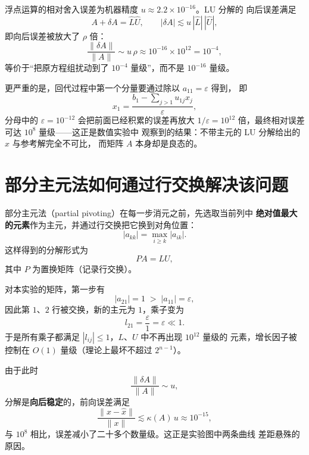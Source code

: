 \documentclass[12pt,a4paper]{ctexart}
\begin{document}
浮点运算的相对舍入误差为机器精度 $u \approx 2.2\times 10^{-16}$。LU 分解的
向后误差满足
\begin{equation}
  A + \delta A = \hat{L}\hat{U},
  \qquad
  |\delta A| \lesssim u\, |\hat{L}|\,|\hat{U}|,
\end{equation}
即向后误差被放大了 $\rho$ 倍：
\begin{equation}
  \frac{\|\delta A\|}{\|A\|} \sim u\,\rho \approx 10^{-16}\times 10^{12} = 10^{-4},
\end{equation}
等价于“把原方程组扰动到了 $10^{-4}$ 量级”，而不是 $10^{-16}$ 量级。

更严重的是，回代过程中第一个分量要通过除以 $a_{11}=\varepsilon$ 得到，
即
\begin{equation}
  x_1 = \frac{b_1 - \sum_{j>1} u_{1j}x_j}{\varepsilon},
\end{equation}
分母中的 $\varepsilon=10^{-12}$ 会把前面已经积累的误差再放大
$1/\varepsilon = 10^{12}$ 倍，最终相对误差可达 $10^8$ 量级——这正是数值实验中
观察到的结果：不带主元的 LU 分解给出的 $x$ 与参考解完全不可比，
而矩阵 $A$ 本身却是良态的。

\section{部分主元法如何通过行交换解决该问题}

部分主元法（partial pivoting）在每一步消元之前，先选取当前列中
\textbf{绝对值最大的元素}作为主元，并通过行交换把它换到对角位置：
\begin{equation}
  |a_{kk}| = \max_{i\ge k} |a_{ik}|.
\end{equation}
这样得到的分解形式为
\begin{equation}
  PA = LU,
\end{equation}
其中 $P$ 为置换矩阵（记录行交换）。

对本实验的矩阵，第一步有
\begin{equation}
  |a_{21}| = 1 \;>\; |a_{11}| = \varepsilon,
\end{equation}
因此第 $1$、$2$ 行被交换，新的主元为 $1$，乘子变为
\begin{equation}
  l_{21} = \frac{\varepsilon}{1} = \varepsilon \ll 1.
\end{equation}
于是所有乘子都满足 $|l_{ij}|\le 1$，$L$、$U$ 中不再出现 $10^{12}$ 量级的
元素，增长因子被控制在 $O(1)$ 量级（理论上最坏不超过 $2^{n-1}$）。

由于此时
\begin{equation}
  \frac{\|\delta A\|}{\|A\|} \sim u,
\end{equation}
分解是\textbf{向后稳定}的，前向误差满足
\begin{equation}
  \frac{\|x - \hat{x}\|}{\|x\|} \lesssim \kappa(A)\, u \approx 10^{-15},
\end{equation}
与 $10^8$ 相比，误差减小了二十多个数量级。这正是实验图中两条曲线
差距悬殊的原因。
\end{document}
